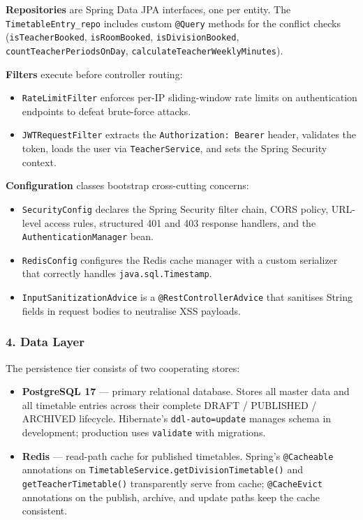 \textbf{Repositories} are Spring Data JPA interfaces, one per entity. The \texttt{TimetableEntry\_repo} includes custom \texttt{@Query} methods for the conflict checks (\texttt{isTeacherBooked}, \texttt{isRoomBooked}, \texttt{isDivisionBooked}, \texttt{countTeacherPeriodsOnDay}, \texttt{calculateTeacherWeeklyMinutes}).

\textbf{Filters} execute before controller routing:
\begin{itemize}
    \item \texttt{RateLimitFilter} enforces per-IP sliding-window rate limits on authentication endpoints to defeat brute-force attacks.
    \item \texttt{JWTRequestFilter} extracts the \texttt{Authorization: Bearer} header, validates the token, loads the user via \texttt{TeacherService}, and sets the Spring Security context.
\end{itemize}

\textbf{Configuration} classes bootstrap cross-cutting concerns:
\begin{itemize}
    \item \texttt{SecurityConfig} declares the Spring Security filter chain, CORS policy, URL-level access rules, structured 401 and 403 response handlers, and the \texttt{AuthenticationManager} bean.
    \item \texttt{RedisConfig} configures the Redis cache manager with a custom serializer that correctly handles \texttt{java.sql.Timestamp}.
    \item \texttt{InputSanitizationAdvice} is a \texttt{@RestControllerAdvice} that sanitises String fields in request bodies to neutralise XSS payloads.
\end{itemize}

\subsubsection{4. Data Layer}

The persistence tier consists of two cooperating stores:

\begin{itemize}
    \item \textbf{PostgreSQL 17} --- primary relational database. Stores all master data and all timetable entries across their complete DRAFT / PUBLISHED / ARCHIVED lifecycle. Hibernate's \texttt{ddl-auto=update} manages schema in development; production uses \texttt{validate} with migrations.
    \item \textbf{Redis} --- read-path cache for published timetables. Spring's \texttt{@Cacheable} annotations on \texttt{TimetableService.getDivisionTimetable()} and \texttt{getTeacherTimetable()} transparently serve from cache; \texttt{@CacheEvict} annotations on the publish, archive, and update paths keep the cache consistent.
\end{itemize}

